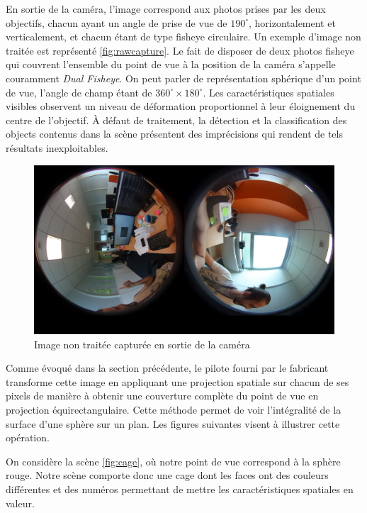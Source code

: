 			En sortie de la caméra, l'image correspond aux photos prises par les deux objectifs, chacun ayant un angle de prise de vue de $190^{\circ}$, horizontalement et verticalement, et chacun étant de type \gls{fisheye} circulaire. Un exemple d'image non traitée est représenté \autoref{fig:rawcapture}. Le fait de disposer de deux photos \gls{fisheye} qui couvrent l'ensemble du point de vue à la position de la caméra s'appelle couramment \emph{Dual Fisheye}. On peut parler de représentation sphérique d'un point de vue, l'angle de champ étant de $360^{\circ}\times180^{\circ}$. Les caractéristiques spatiales visibles observent un niveau de déformation proportionnel à leur éloignement du centre de l'objectif. À défaut de traitement, la détection et la classification des objects contenus dans la scène présentent des imprécisions qui rendent de tels résultats inexploitables.
			\begin{figure}[H]
			{
				\centering
				\includegraphics[width=1\textwidth]{figures/capture.jpg}
				\caption{Image non traitée capturée en sortie de la caméra}
				\label{fig:rawcapture}
			}
			\end{figure}
			\par
			Comme évoqué dans la section précédente, le pilote fourni par le fabricant transforme cette image en appliquant une projection spatiale sur chacun de ses pixels de manière à obtenir une couverture complète du point de vue en projection équirectangulaire. Cette méthode permet de voir l'intégralité de la surface d'une sphère sur un plan. Les figures suivantes visent à illustrer cette opération.
			\par
			On considère la scène \autoref{fig:cage}, où notre point de vue correspond à la sphère rouge. Notre scène comporte donc une cage dont les faces ont des couleurs différentes et des numéros permettant de mettre les caractéristiques spatiales en valeur.
